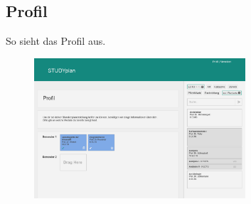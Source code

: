 \subsection{Profil}
So sieht das Profil aus.
\begin{figure}[!htb]
	\caption{}
	\label{fig:gui-profil-1}
	\centering
	\includegraphics[width=0.7\textwidth]{../GUI/ergebnisse/profil-1.png}
\end{figure}